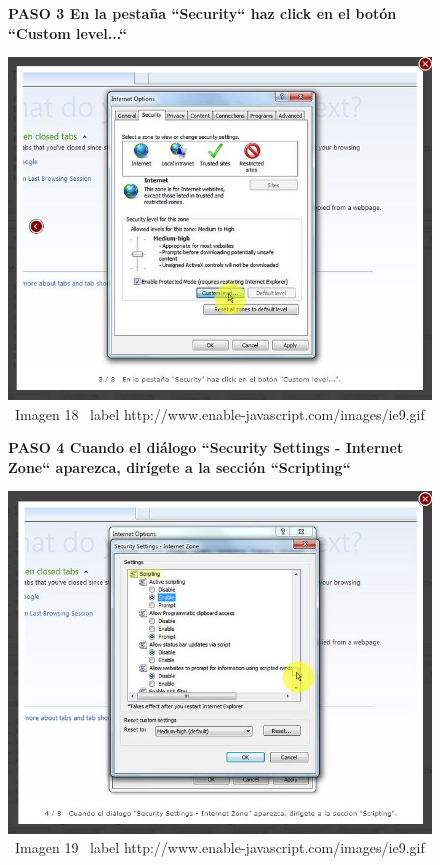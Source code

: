 \documentclass[11pt]{article} %
\begin{document}
\begin{figure}
\begin{center}

\begin{center}
\bf PASO 3
En la pestaña ``Security`` haz click en el botón ``Custom level...``
\end{center}
\includegraphics[height=8 cm, width=8 cm] {imagenes/explorer 03.jpg}
\newline
\newline
\ Imagen 18 
\ label {http://www.enable-javascript.com/images/ie9.gif }
\newline
\begin{center}
\bf PASO 4
Cuando el diálogo ``Security Settings - Internet Zone`` aparezca, dirígete a la sección ``Scripting``
\end{center}
\includegraphics[height=8 cm, width=8 cm] {imagenes/explorer 04.jpg}
\newline
\newline
\ Imagen 19
\ label {http://www.enable-javascript.com/images/ie9.gif }

\end{center}
\end{figure}
\end{document}
